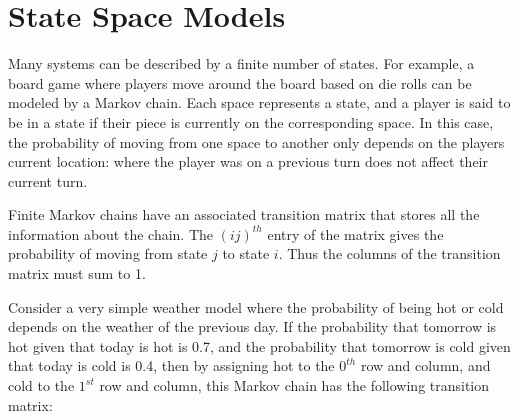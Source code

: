 \label{lab:Markov}



\section*{State Space Models} %

Many systems can be described by a finite number of states.
For example, a board game where players move around the board based on die rolls can be modeled by a Markov chain.
Each space represents a state, and a player is said to be in a state if their piece is currently on the corresponding space.
In this case, the probability of moving from one space to another only depends on the players current location: where the player was on a previous turn does not affect their current turn.

Finite Markov chains have an associated transition matrix that stores all the information about the chain.
The $(ij)^{th}$ entry of the matrix gives the probability of moving from state $j$ to state $i$.
Thus the columns of the transition matrix must sum to 1. %

Consider a very simple weather model where the probability of being hot or cold depends on the weather of the previous day.
If the probability that tomorrow is hot given that today is hot is 0.7, and the probability that tomorrow is cold given that today is cold is 0.4, then by assigning hot to the $0^{th}$ row and column, and cold to the $1^{st}$ row and column, this Markov chain has the following transition matrix:

